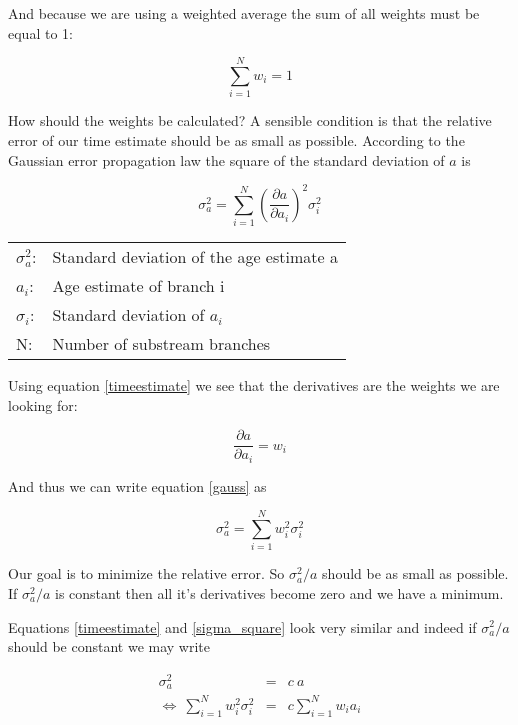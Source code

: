 And because we are using a weighted average the sum of all
weights must be equal to 1:

\begin{equation}
\sum_{i = 1}^{N} w_i = 1  \label{normalization}
\end{equation}

How should the weights be calculated? A sensible condition
is that the relative error of our time estimate should be as small as
possible. According to the Gaussian error propagation law
the square of the standard deviation of $a$ is

\begin{equation}
\sigma_a^2 = \sum_{i = 1}^{N} \left(\frac{\partial a}{\partial a_i}
\right)^2 \sigma_i^2  \label{gauss}
\end{equation}

\begin{tabular}{ll}
$\sigma_a^2$: &  Standard deviation of the age estimate a\\
$a_i$: &  Age estimate of branch i\\
$\sigma_i$: &  Standard deviation of $a_i$\\
N: &  Number of substream branches
\end{tabular}
\vspace{1em}

Using equation \ref{timeestimate} we see that the derivatives
are the weights we are looking for:

\begin{equation}
\frac{\partial a}{\partial a_i} = w_i
\end{equation}

And thus we can write equation \ref{gauss} as

\begin{equation}
\sigma_a^2 = \sum_{i = 1}^{N} w_i^2 \sigma_i^2 \label{sigma_square}
\end{equation}

Our goal is to minimize the relative error. So $\sigma_a^2/a$
should be as small as possible. If $\sigma_a^2/a$ is constant
then all it's derivatives become zero and we have a minimum.

Equations \ref{timeestimate} and \ref{sigma_square} look very
similar and indeed if $\sigma_a^2/a$ should be constant we may
write

\begin{eqnarray}
\sigma_a^2 & = & c\ a \\
\Leftrightarrow\ \sum_{i = 1}^{N} w_i^2 \sigma_i^2 & = & c \sum_{i = 1}^{N} w_i a_i
\end{eqnarray}

